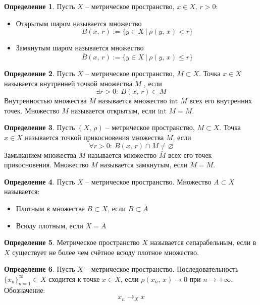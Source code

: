 \documentclass[a4paper,12pt]{article}
\renewcommand{\leq}{\ensuremath{\leqslant}}
\renewcommand{\emptyset}{\ensuremath{\varnothing}}
\theoremstyle{plain}
\theoremstyle{definition}
\newtheorem{definition}{Определение}[section]
\theoremstyle{remark}
\begin{document}
\begin{definition}
	Пусть $X$ -- метрическое пространство, $x \in X,\, r > 0$:
	\begin{itemize}
		\item Открытым шаром называется множество
		      \[
			      B(x,\, r) := \{y \in X \:\vert\: \rho(y,\,x) < r\}
		      \]
		\item Замкнутым шаром называется множество
		      \[
			      \overline{B}(x,\,r) := \{y \in X \:\vert\: \rho(y,\,x) \leq r\}
		      \]
	\end{itemize}
\end{definition}

\begin{definition}
	Пусть $X$ -- метрическое пространство, $M \subset X$. Точка $x \in X$ называется внутренней точкой множества $M$ , если 
	\[
		\exists r > 0 :\: B(x,\, r) \subset M	
	\]
	Внутренностью множества $M$ называется множество $\text{int }M$ всех его внутренних точек. Множество $M$ называется открытым, если $\text{int }M = M$.
\end{definition}

\begin{definition}
	Пусть $(X,\, \rho)$ -- метрическое пространство, $M \subset X$. Точка $x \in X$ называется точкой прикосновения множества $M$, если
	\[
		\forall r > 0 :\: B(x,\, r) \cap M \neq \emptyset
	\]
	Замыканием множества $M$ называется множество $\overline{M}$ всех его точек прикосновения. Множество $M$ называется замкнутым, если $\overline{M} = M$.
\end{definition}

\begin{definition}
	Пусть $X$ -- метрическое пространство. Множество $A \subset X$ называется:
	\begin{itemize}
		\item Плотным в множестве $B \subset X$, если $B \subset \overline{A}$
		\item Всюду плотным, если $X = \overline{A}$
	\end{itemize}
\end{definition}

\begin{definition}
	Метрическое пространство $X$ называется сепарабельным, если в $X$ существует не более чем счётное всюду плотное множество.
\end{definition}

\begin{definition}
	Пусть $X$ -- метрическое пространство. Последовательность $\{x_n\}_{n = 1}^\infty \subset X$ сходится к точке $x \in X$, если $\rho(x_n,\, x) \to 0$ при $n \to +\infty$. Обозначение:
	\[
		x_n \to_X x
	\]
\end{definition}
\end{document}
